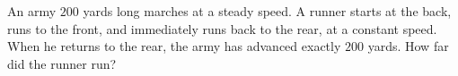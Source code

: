 An army $200$ yards long marches at a steady speed. A runner starts at the back, runs to the front, and immediately runs back to the rear, at a constant speed. When he returns to the rear, the army has advanced exactly $200$ yards. How far did the runner run?
